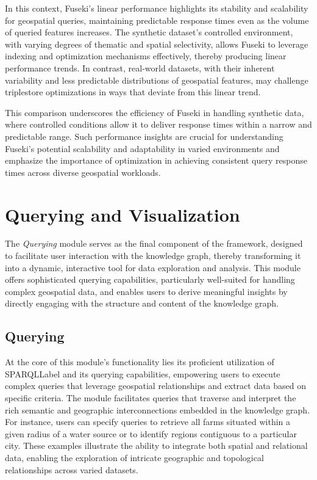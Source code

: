 In this context, Fuseki’s linear performance highlights its stability and scalability for geospatial queries, maintaining predictable response times even as the volume of queried features increases. The synthetic dataset’s controlled environment, with varying degrees of thematic and spatial selectivity, allows Fuseki to leverage indexing and optimization mechanisms effectively, thereby producing linear performance trends. In contrast, real-world datasets, with their inherent variability and less predictable distributions of geospatial features, may challenge triplestore optimizations in ways that deviate from this linear trend. 

This comparison underscores the efficiency of Fuseki in handling synthetic data, where controlled conditions allow it to deliver response times within a narrow and predictable range. Such performance insights are crucial for understanding Fuseki’s potential scalability and adaptability in varied environments and emphasize the importance of optimization in achieving consistent query response times across diverse geospatial workloads.


\section{Querying and Visualization}\label{VI-sec:querying}
The \textit{Querying} module serves as the final component of the framework, designed to facilitate user interaction with the knowledge graph, thereby transforming it into a dynamic, interactive tool for data exploration and analysis. This module offers sophisticated querying capabilities, particularly well-suited for handling complex geospatial data, and enables users to derive meaningful insights by directly engaging with the structure and content of the knowledge graph.


\subsection{Querying}\label{VI-subsec:querying}

At the core of this module’s functionality lies its proficient utilization of \acrshort{SPARQLLabel} \cite{ericprudhommeauxSPARQLQueryLanguage2008} and its querying capabilities, empowering users to execute complex queries that leverage geospatial relationships and extract data based on specific criteria. The module facilitates queries that traverse and interpret the rich semantic and geographic interconnections embedded in the knowledge graph. For instance, users can specify queries to retrieve all farms situated within a given radius of a water source or to identify regions contiguous to a particular city. These examples illustrate the ability to integrate both spatial and relational data, enabling the exploration of intricate geographic and topological relationships across varied datasets.

